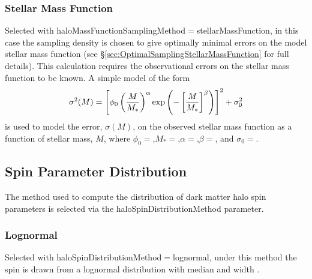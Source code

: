 \subsubsection{Stellar Mass Function}

Selected with {\normalfont \ttfamily haloMassFunctionSamplingMethod}$=${\normalfont \ttfamily stellarMassFunction}, in this case the sampling density is chosen to give optimally minimal errors on the model stellar mass function (see \S\ref{sec:OptimalSamplingStellarMassFunction} for full details). This calculation requires the observational errors on the stellar mass function to be known. A simple model of the form
\begin{equation}
 \sigma^2(M) = \left[\phi_0 \left({M\over M_*}\right)^\alpha \exp\left(-\left[{M\over M_*}\right]^\beta\right)\right]^2 + \sigma_0^2
\end{equation}
is used to model the error, $\sigma(M)$, on the observed stellar mass function as a function of stellar mass, $M$, where $\phi_0=${\normalfont \ttfamily [haloMassFunctionSamplingStellarMassFunctionErrorPhi0]},$M_*=${\normalfont \ttfamily [haloMassFunctionSamplingStellarMassFunctionErrorMstar]},$\alpha=${\normalfont \ttfamily [haloMassFunctionSamplingStellarMassFunctionErrorAlpha]},$\beta=${\normalfont \ttfamily [haloMassFunctionSamplingStellarMassFunctionErrorBeta]}, and $\sigma_0=${\normalfont \ttfamily [haloMassFunctionSamplingStellarMassFunctionErrorConstant]}.

\subsection{Spin Parameter Distribution}\label{sec:SpinParameterDistribution}

The method used to compute the distribution of dark matter halo spin parameters is selected via the {\normalfont \ttfamily haloSpinDistributionMethod} parameter.

\subsubsection{Lognormal}

Selected with {\normalfont \ttfamily haloSpinDistributionMethod}$=${\normalfont \ttfamily lognormal}, under this method the spin is drawn from a lognormal distribution with median {\normalfont \ttfamily [lognormalSpinDistributionMedian]} and width {\normalfont \ttfamily [lognormalSpinDistributionSigma]}.

